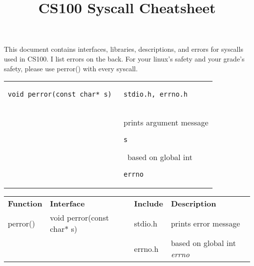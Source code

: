 \documentclass{article}
\title{CS100 Syscall Cheatsheet}
\author{}
\date{}
\begin{document}
\maketitle

\large This document contains interfaces, libraries, descriptions, and errors for 
syscalls used in CS100. I list errors on the back. For your linux's safety and 
your grade's safety, please use perror() with every syscall.

\begin{tabular}{l|l}
\begin{lstlisting} 
void perror(const char* s) 
\end{lstlisting} 
&
\begin{lstlisting} 
stdio.h, errno.h 
\end{lstlisting}
\\
& prints argument message \begin{lstlisting} 
s 
\end{lstlisting}
\ based on global int 
    \begin{lstlisting}
errno
    \end{lstlisting}
\end{tabular}


\medskip
\begin{tabular}{llll}
    \bf Function & \bf Interface & \bf Include & \bf Description\\
    perror() & void perror(const char* s) &  stdio.h &  prints error message\\
    && errno.h & based on global int \it errno \rm
\end{tabular}
\normalsize
\end{document}
